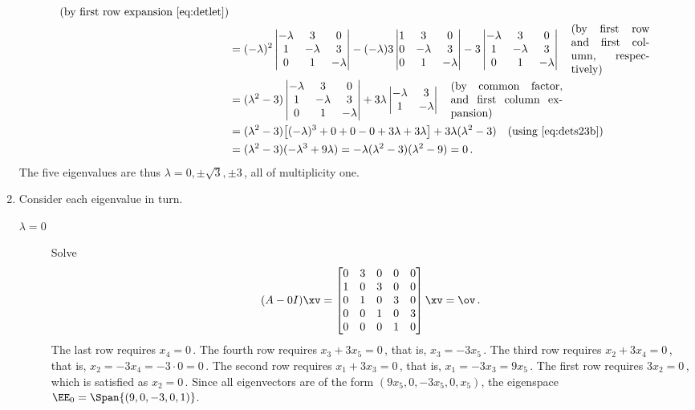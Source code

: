 \begin{example}
\begin{solution}
\begin{enumerate}
\begin{align*}
\quad(\text{by first row expansion~\eqref{eq:detlet}})
\\&=(-\lambda)^2\begin{vmatrix}-\lambda&3&0
\\1&-\lambda&3
\\0&1&-\lambda\end{vmatrix}
-(-\lambda)3\begin{vmatrix}1&3&0
\\0&-\lambda&3
\\0&1&-\lambda\end{vmatrix}
-3\begin{vmatrix}-\lambda&3&0
\\1&-\lambda&3
\\0&1&-\lambda\end{vmatrix}
\quad\parbox[c]{7em}{({by first row and first column, respectively})}
\\&=(\lambda^2-3)\begin{vmatrix}-\lambda&3&0
\\1&-\lambda&3
\\0&1&-\lambda\end{vmatrix}
+3\lambda\begin{vmatrix}-\lambda&3
\\1&-\lambda\end{vmatrix}
\quad\parbox[c]{10em}{(by common factor, and first column expansion)}
\\&=(\lambda^2-3)\big[(-\lambda)^3+0+0-0+3\lambda+3\lambda\big]
+3\lambda(\lambda^2-3)
\quad(\text{using~\eqref{eq:dets23b}})
\\&=(\lambda^2-3)(-\lambda^3+9\lambda)
=-\lambda(\lambda^2-3)(\lambda^2-9)=0\,.
\end{align*}
The five eigenvalues are thus \(\lambda=0,\pm\sqrt3,\pm3\)\,, all of multiplicity one.

\item Consider each eigenvalue in turn.
\begin{description}
\item[\(\lambda=0\)]  Solve
\begin{equation*}
(A-0I)\xv=\begin{bmatrix}0&3&0&0&0
\\1&0&3&0&0
\\0&1&0&3&0
\\0&0&1&0&3
\\0&0&0&1&0\end{bmatrix}\xv=\ov\,.
\end{equation*}
The last row requires \(x_4=0\)\,.
The fourth row requires \(x_3+3x_5=0\)\,, that is, \(x_3=-3x_5\)\,.
The third row requires \(x_2+3x_4=0\)\,, that is, \(x_2=-3x_4=-3\cdot 0=0\)\,.
The second row requires \(x_1+3x_3=0\)\,, that is, \(x_1=-3x_3=9x_5\)\,.
The first row requires \(3x_2=0\)\,, which is satisfied as \(x_2=0\)\,.
Since all eigenvectors are of the form \((9x_5,0,-3x_5,0,x_5)\), the eigenspace \(\EE_0=\Span\{(9,0,-3,0,1)\}\).


\end{description}
\end{enumerate}
\end{solution}
\end{example}
